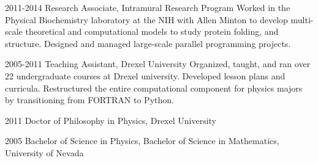 \documentclass[]{scrartcl}
\begin{document}
\begin{cleanCV}
\WorkExperience
{2011-2014}
{Research Associate, Intramural Research Program}
{
Worked in the Physical Biochemistry laboratory at the NIH with Allen Minton to develop multi-scale theoretical and computational models to study protein folding, and structure.
Designed and managed large-scale parallel programming projects.
}

\WorkExperience
{2005-2011}
{Teaching Assistant, Drexel University}
{%
  Organized, taught, and ran over 22 undergraduate courses at Drexel university.
  Developed lesson plans and curricula.
  Restructured the entire computational component for physics majors by transitioning from FORTRAN to Python.
}

\Highlight
{2011}
{Doctor of Philosophy in Physics, Drexel University}

\Highlight
{2005}
{Bachelor of Science in Physics, Bachelor of Science in Mathematics, University of Nevada}







\end{cleanCV}
\end{document}
